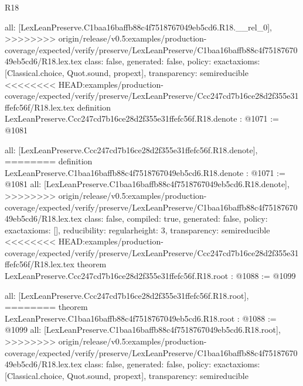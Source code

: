 \begin{lexlean}{R18}
\begin{coremodule}
{{{{{{{{{{{{  all: [LexLeanPreserve.C1baa16baffb88c4f7518767049eb5cd6.R18.__rel_0],
>>>>>>>> origin/release/v0.5:examples/production-coverage/expected/verify/preserve/LexLeanPreserve/C1baa16baffb88c4f7518767049eb5cd6/R18.lex.tex
  class: false,
  generated: false,
  policy: exact{axioms: [Classical.choice, Quot.sound, propext]},
  transparency: semireducible
}
<<<<<<<< HEAD:examples/production-coverage/expected/verify/preserve/LexLeanPreserve/Ccc247cd7b16ce28d2f355e31ffefc56f/R18.lex.tex
definition LexLeanPreserve.Ccc247cd7b16ce28d2f355e31ffefc56f.R18.denote : @1071 := @1081 {
  all: [LexLeanPreserve.Ccc247cd7b16ce28d2f355e31ffefc56f.R18.denote],
========
definition LexLeanPreserve.C1baa16baffb88c4f7518767049eb5cd6.R18.denote : @1071 := @1081 {
  all: [LexLeanPreserve.C1baa16baffb88c4f7518767049eb5cd6.R18.denote],
>>>>>>>> origin/release/v0.5:examples/production-coverage/expected/verify/preserve/LexLeanPreserve/C1baa16baffb88c4f7518767049eb5cd6/R18.lex.tex
  class: false,
  compiled: true,
  generated: false,
  policy: exact{axioms: []},
  reducibility: regular{height: 3},
  transparency: semireducible
}
<<<<<<<< HEAD:examples/production-coverage/expected/verify/preserve/LexLeanPreserve/Ccc247cd7b16ce28d2f355e31ffefc56f/R18.lex.tex
theorem LexLeanPreserve.Ccc247cd7b16ce28d2f355e31ffefc56f.R18.root : @1088 := @1099 {
  all: [LexLeanPreserve.Ccc247cd7b16ce28d2f355e31ffefc56f.R18.root],
========
theorem LexLeanPreserve.C1baa16baffb88c4f7518767049eb5cd6.R18.root : @1088 := @1099 {
  all: [LexLeanPreserve.C1baa16baffb88c4f7518767049eb5cd6.R18.root],
>>>>>>>> origin/release/v0.5:examples/production-coverage/expected/verify/preserve/LexLeanPreserve/C1baa16baffb88c4f7518767049eb5cd6/R18.lex.tex
  class: false,
  generated: false,
  policy: exact{axioms: [Classical.choice, Quot.sound, propext]},
  transparency: semireducible
}

}}}}}}}}}}}}}
\end{coremodule}
\end{lexlean}
